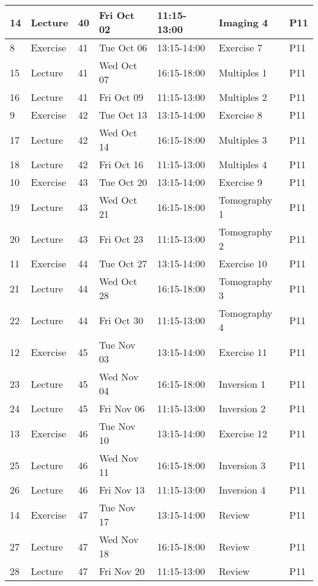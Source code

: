 \documentclass{article}
\begin{document}
\begin{tabular}{|l|l|l|l|l|l|l|}
14 & Lecture & 40 & Fri Oct 02 & 11:15-13:00 & Imaging 4 & P11\\ \hline
8 & Exercise & 41 & Tue Oct 06 & 13:15-14:00 & Exercise 7 & P11\\ \hline
15 & Lecture & 41 & Wed Oct 07 & 16:15-18:00 & Multiples 1 & P11\\ \hline
16 & Lecture & 41 & Fri Oct 09 & 11:15-13:00 & Multiples 2 & P11\\ \hline
9 & Exercise & 42 & Tue Oct 13 & 13:15-14:00 & Exercise 8 & P11\\ \hline
17 & Lecture & 42 & Wed Oct 14 & 16:15-18:00 & Multiples 3 & P11\\ \hline
18 & Lecture & 42 & Fri Oct 16 & 11:15-13:00 & Multiples 4 & P11\\ \hline
10 & Exercise & 43 & Tue Oct 20 & 13:15-14:00 & Exercise 9 & P11\\ \hline
19 & Lecture & 43 & Wed Oct 21 & 16:15-18:00 & Tomography 1 & P11\\ \hline
20 & Lecture & 43 & Fri Oct 23 & 11:15-13:00 & Tomography 2 & P11\\ \hline
11 & Exercise & 44 & Tue Oct 27 & 13:15-14:00 & Exercise 10 & P11\\ \hline
21 & Lecture & 44 & Wed Oct 28 & 16:15-18:00 & Tomography 3 & P11\\ \hline
22 & Lecture & 44 & Fri Oct 30 & 11:15-13:00 & Tomography 4 & P11\\ \hline
12 & Exercise & 45 & Tue Nov 03 & 13:15-14:00 & Exercise 11 & P11\\ \hline
23 & Lecture & 45 & Wed Nov 04 & 16:15-18:00 & Inversion 1 & P11\\ \hline
24 & Lecture & 45 & Fri Nov 06 & 11:15-13:00 & Inversion 2 & P11\\ \hline
13 & Exercise & 46 & Tue Nov 10 & 13:15-14:00 & Exercise 12 & P11\\ \hline
25 & Lecture & 46 & Wed Nov 11 & 16:15-18:00 & Inversion 3 & P11\\ \hline
26 & Lecture & 46 & Fri Nov 13 & 11:15-13:00 & Inversion 4 & P11\\ \hline
14 & Exercise & 47 & Tue Nov 17 & 13:15-14:00 & Review & P11\\ \hline
27 & Lecture & 47 & Wed Nov 18 & 16:15-18:00 & Review & P11\\ \hline
28 & Lecture & 47 & Fri Nov 20 & 11:15-13:00 & Review & P11\\ \hline
\end{tabular}
\end{document}
